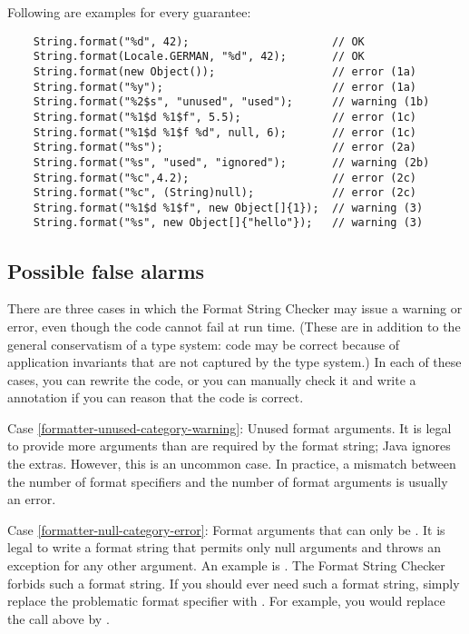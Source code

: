 \noindent Following are examples for every guarantee:

\begin{Verbatim}
    String.format("%d", 42);                      // OK
    String.format(Locale.GERMAN, "%d", 42);       // OK
    String.format(new Object());                  // error (1a)
    String.format("%y");                          // error (1a)
    String.format("%2$s", "unused", "used");      // warning (1b)
    String.format("%1$d %1$f", 5.5);              // error (1c)
    String.format("%1$d %1$f %d", null, 6);       // error (1c)
    String.format("%s");                          // error (2a)
    String.format("%s", "used", "ignored");       // warning (2b)
    String.format("%c",4.2);                      // error (2c)
    String.format("%c", (String)null);            // error (2c)
    String.format("%1$d %1$f", new Object[]{1});  // warning (3)
    String.format("%s", new Object[]{"hello"});   // warning (3)
\end{Verbatim}

\subsection{Possible false alarms\label{formatter-false-alarms}}

There are three cases in which the Format String Checker may issue a
warning or error, even though the code cannot fail at run time.
(These are in addition to the general conservatism of a type system:  code
may be correct because of application invariants that are not captured by
the type system.)
In each of these cases, you can rewrite the code, or you can manually check
it and write a  annotation if you can reason that
the code is correct.


Case \ref{formatter-unused-category-warning}:
  Unused format arguments.  It is legal to provide more arguments than are
  required by the format string; Java ignores the extras.  However, this is
  an uncommon case.  In practice, a mismatch between the number of format
  specifiers and the number of format arguments is usually an error.

Case \ref{formatter-null-category-error}:
  Format arguments that can only be .
  It is legal to write a format string that permits only null arguments and
  throws an exception for any other argument.  An example is
  .
  The Format String Checker forbids such a format string.
  If you should ever need such a format string, simply replace the problematic
  format specifier with .  For example, you would replace the
  call above by .

